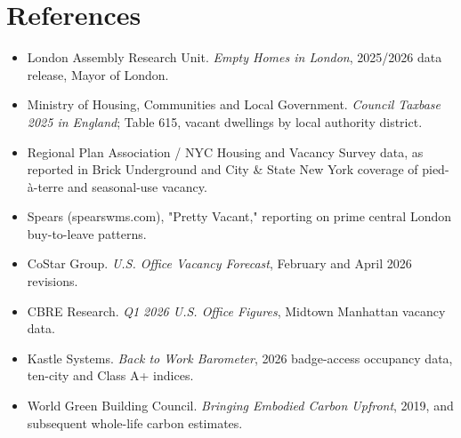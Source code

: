 \documentclass[11pt]{article}
\begin{document}
\section*{References}
\begin{itemize}[nosep]
\item London Assembly Research Unit. \emph{Empty Homes in London}, 2025/2026 data release, Mayor of London.
\item Ministry of Housing, Communities and Local Government. \emph{Council Taxbase 2025 in England}; Table 615, vacant dwellings by local authority district.
\item Regional Plan Association / NYC Housing and Vacancy Survey data, as reported in Brick Underground and City \& State New York coverage of pied-\`a-terre and seasonal-use vacancy.
\item Spears (spearswms.com), "Pretty Vacant," reporting on prime central London buy-to-leave patterns.
\item CoStar Group. \emph{U.S. Office Vacancy Forecast}, February and April 2026 revisions.
\item CBRE Research. \emph{Q1 2026 U.S. Office Figures}, Midtown Manhattan vacancy data.
\item Kastle Systems. \emph{Back to Work Barometer}, 2026 badge-access occupancy data, ten-city and Class A+ indices.
\item World Green Building Council. \emph{Bringing Embodied Carbon Upfront}, 2019, and subsequent whole-life carbon estimates.
\end{itemize}
\end{document}
